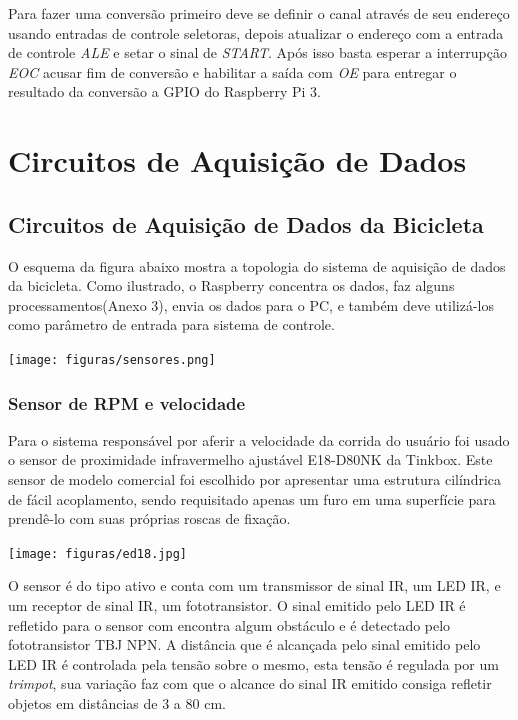 	Para fazer uma conversão primeiro deve se definir o canal através de seu endereço usando entradas de controle seletoras, depois atualizar o endereço com a entrada de controle \textit{ALE} e setar o sinal de \textit{START}. Após isso basta esperar a interrupção \textit{EOC} acusar fim de conversão e habilitar a saída com \textit{OE} para entregar o resultado da conversão a GPIO do Raspberry Pi 3.

\section{Circuitos de Aquisição de Dados}


\subsection{Circuitos de Aquisição de Dados da Bicicleta}

O esquema da figura abaixo mostra a topologia do sistema de aquisição de dados da bicicleta.  Como ilustrado, o Raspberry  concentra os dados, faz alguns processamentos(Anexo 3), envia os dados para o PC,  e também deve utilizá-los como parâmetro de entrada para sistema de controle.
            \begin{center}
   	\texttt{[image: figuras/sensores.png]}
        \label{sensores}
   \end{center}


\subsubsection{Sensor de RPM e velocidade}

		Para o sistema responsável por aferir a velocidade da corrida do usuário foi usado o sensor de proximidade infravermelho ajustável E18-D80NK da Tinkbox. Este sensor de modelo comercial foi escolhido por apresentar uma estrutura cilíndrica de fácil acoplamento, sendo requisitado apenas um furo em uma superfície para prendê-lo com suas próprias roscas de fixação.

            \begin{center}
    	\texttt{[image: figuras/ed18.jpg]}
        \label{ir_model}
    \end{center}

	O sensor é do tipo ativo e conta com um transmissor de sinal IR, um LED IR, e um receptor de sinal IR, um fototransistor. O sinal emitido pelo LED IR é refletido para o sensor com encontra algum obstáculo e é detectado pelo fototransistor TBJ NPN. A distância que é alcançada pelo sinal emitido pelo LED IR é controlada pela tensão sobre o mesmo, esta tensão é regulada por um \textit{trimpot}, sua variação faz com que o alcance do sinal IR emitido consiga refletir objetos em distâncias de 3 a 80 cm.


